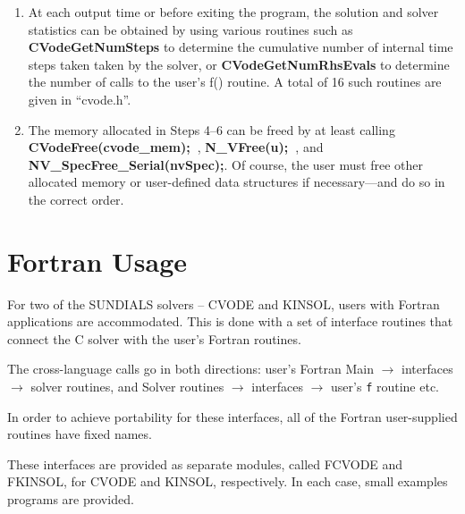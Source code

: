 \begin{enumerate}
\item At each output time or before exiting the program, the solution
and solver statistics can be obtained by using various routines such
as {\bf CVodeGetNumSteps} to determine the cumulative number of
internal time steps taken taken by the solver, or {\bf
CVodeGetNumRhsEvals} to determine the number of calls to the user's
f() routine. A total of 16 such routines are given in ``cvode.h''.

\item The memory allocated in Steps 4--6 can be freed by at least calling
{\bf CVodeFree(cvode\_mem);~}, {\bf N\_VFree(u);~}, and {\bf
NV\_SpecFree\_Serial(nvSpec);}. Of course, the user must free other
allocated memory or user-defined data structures if necessary---and do so in the
correct order.

\end{enumerate}


\section{Fortran Usage}

For two of the SUNDIALS solvers -- CVODE and KINSOL, users with
Fortran applications are accommodated.  This is done with a set of
interface routines that connect the C solver with the user's Fortran
routines.

The cross-language calls go in both directions:
\newline \hspace*{.5in} user's Fortran Main $\longrightarrow$
interfaces $\longrightarrow$ solver routines, and
\newline \hspace*{.5in} Solver routines $\longrightarrow$ interfaces
$\longrightarrow$ user's {\tt f} routine etc.

In order to achieve portability for these interfaces, all of the
Fortran user-supplied routines have fixed names.

These interfaces are provided as separate modules, called FCVODE and
FKINSOL, for CVODE and KINSOL, respectively.  In each case, small
examples programs are provided.


